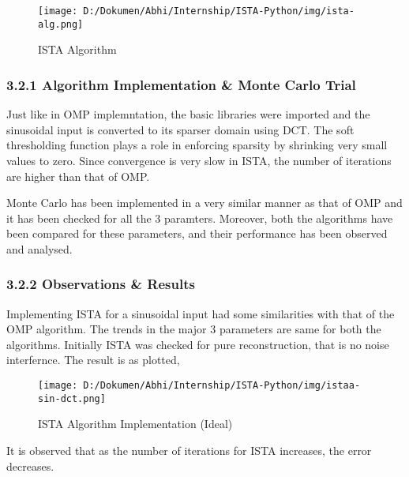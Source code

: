 \documentclass[
  letterpaper,
  DIV=11,
  numbers=noendperiod]{scrartcl}
\begin{document}
\begin{figure}[H]

{\centering \texttt{[image: D:/Dokumen/Abhi/Internship/ISTA-Python/img/ista-alg.png]}

}

\caption{ISTA Algorithm}

\end{figure}%

\subsubsection{3.2.1 Algorithm Implementation \& Monte Carlo
Trial}\label{algorithm-implementation-monte-carlo-trial}

Just like in OMP implemntation, the basic libraries were imported and
the sinusoidal input is converted to its sparser domain using DCT. The
soft thresholding function plays a role in enforcing sparsity by
shrinking very small values to zero. Since convergence is very slow in
ISTA, the number of iterations are higher than that of OMP.

Monte Carlo has been implemented in a very similar manner as that of OMP
and it has been checked for all the 3 paramters. Moreover, both the
algorithms have been compared for these parameters, and their
performance has been observed and analysed.

\subsubsection{3.2.2 Observations \&
Results}\label{observations-results-1}

Implementing ISTA for a sinusoidal input had some similarities with that
of the OMP algorithm. The trends in the major 3 parameters are same for
both the algorithms. Initially ISTA was checked for pure reconstruction,
that is no noise interfernce. The result is as plotted,

\begin{figure}[H]

{\centering \texttt{[image: D:/Dokumen/Abhi/Internship/ISTA-Python/img/istaa-sin-dct.png]}

}

\caption{ISTA Algorithm Implementation (Ideal)}

\end{figure}%

It is observed that as the number of iterations for ISTA increases, the
error decreases.
\end{document}
